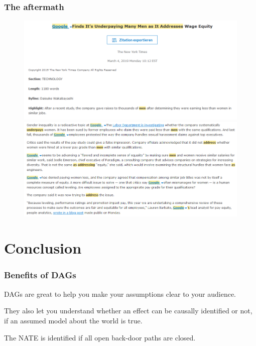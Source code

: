 \documentclass[12pt,english,dvipsnames,aspectratio=169,handout]{beamer}
\begin{document}
\begin{frame}
	\frametitle{The aftermath}
	
	\begin{figure}
		\centering
		\includegraphics[scale=0.3]{../04-figures/04/04-05}
		\includegraphics[scale=0.3]{../04-figures/04/04-06}
	\end{figure}
\end{frame}


\section{Conclusion}

\begin{frame}
	\frametitle{Benefits of DAGs}
	DAGs are great to help you make your assumptions clear to your audience.\bigskip
	
	\pause
	
	They also let you understand whether an effect can be causally identified or not, if an assumed model about the world is true.\bigskip
	
	\pause
	
	The NATE is identified if all open back-door paths are closed.
\end{frame}
\end{document}
